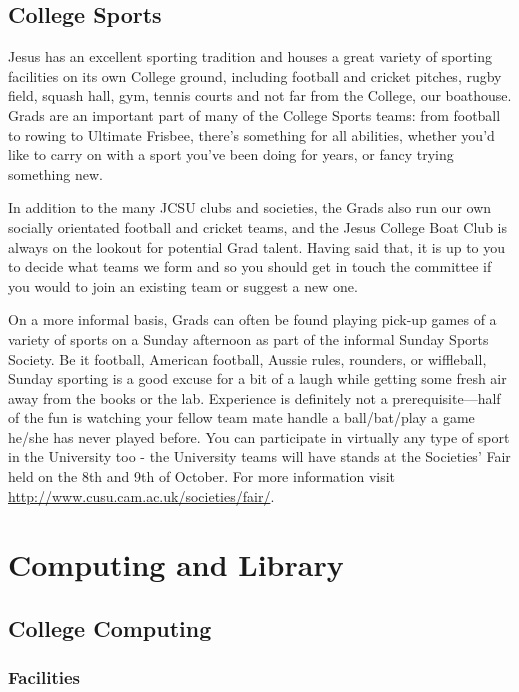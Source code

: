 \documentclass[11pt,fleqn, oneside]{book} %
\begin{document}
\section{College Sports}

Jesus has an excellent sporting tradition and houses a great variety of sporting facilities on its own College ground, including football and cricket pitches, rugby field, squash hall, gym, tennis courts and not far from the College, our boathouse. Grads are an important part of many of the College Sports teams: from football to rowing to Ultimate Frisbee, there’s something for all abilities, whether you’d like to carry on with a sport you’ve been doing for years, or fancy trying something new. 

In addition to the many JCSU clubs and societies, the Grads also run our own socially orientated football and cricket teams, and the Jesus College Boat Club is always on the lookout for potential Grad talent. Having said that, it is up to you to decide what teams we form and so you should get in touch the committee if you would to join an existing team or suggest a new one.

On a more informal basis, Grads can often be found playing pick-up games of a variety of sports on a Sunday afternoon as part of the informal Sunday Sports Society. Be it football, American football, Aussie rules, rounders, or wiffleball, Sunday sporting is a good excuse for a bit of a laugh while getting some fresh air away from the books or the lab. Experience is definitely not a prerequisite—half of the fun is watching your fellow team mate handle a ball/bat/play a game he/she has never played before. 
You can participate in virtually any type of sport in the University too - the University teams will have stands at the Societies' Fair held on the 8th and 9th of October. For more information visit \url{http://www.cusu.cam.ac.uk/societies/fair/}. 
 

\chapter{Computing and Library}

\section{College Computing}

\subsection{Facilities}
\end{document}

